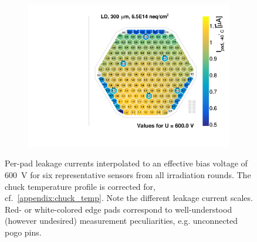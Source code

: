 \begin{figure}
\begin{subfigure}[b]{0.32\textwidth}
		\subcaption{
		}
		\label{plot:iv_hexplot_1013}
	\end{subfigure}
	\hfill
	\begin{subfigure}[b]{0.32\textwidth}
		\includegraphics[width=0.999\textwidth]{plots/iv_hexplots/1002.pdf}
		\subcaption{
		}
		\label{plot:iv_hexplot_1002}
	\end{subfigure}	
	\caption{
		Per-pad leakage currents interpolated to an effective bias voltage of \SI{600}{\volt} for six representative sensors from all irradiation rounds.
		The chuck temperature profile is corrected for, cf.~\ref{appendix:chuck_temp}.
		Note the different leakage current scales.
		Red- or white-colored edge pads correspond to well-understood (however undesired) measurement peculiarities, e.g. unconnected pogo pins.
	}
\end{figure}


